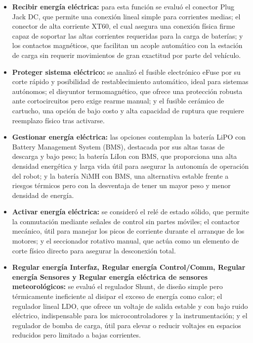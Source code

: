 \documentclass[../../General.tex]{subfiles}
\begin{document}
\begin{itemize}
	\item \textbf{Recibir energía eléctrica:} para esta función se evaluó el conector Plug Jack DC, que permite una conexión lineal simple para corrientes medias; el conector de alta corriente XT60, el cual asegura una conexión física firme capaz de soportar las altas corrientes requeridas para la carga de baterías; y los contactos magnéticos, que facilitan un acople automático con la estación de carga sin requerir movimientos de gran exactitud por parte del vehículo.
	
	\item \textbf{Proteger sistema eléctrico:} se analizó el fusible electrónico eFuse por su corte rápido y posibilidad de restablecimiento automático, ideal para sistemas autónomos; el disyuntor termomagnético, que ofrece una protección robusta ante cortocircuitos pero exige rearme manual; y el fusible cerámico de cartucho, una opción de bajo costo y alta capacidad de ruptura que requiere reemplazo físico tras activarse.
	
	\item \textbf{Gestionar energía eléctrica:} las opciones contemplan la batería LiPO con Battery Management System (BMS), destacada por sus altas tasas de descarga y bajo peso; la batería LiIon con BMS, que proporciona una alta densidad energética y larga vida útil para asegurar la autonomía de operación del robot; y la batería NiMH con BMS, una alternativa estable frente a riesgos térmicos pero con la desventaja de tener un mayor peso y menor densidad de energía.
	
	\item \textbf{Activar energía eléctrica:} se consideró el relé de estado sólido, que permite la conmutación mediante señales de control sin partes móviles; el contactor mecánico, útil para manejar los picos de corriente durante el arranque de los motores; y el seccionador rotativo manual, que actúa como un elemento de corte físico directo para asegurar la desconexión total.
	
	\item \textbf{Regular energía Interfaz, Regular energía Control/Comm, Regular energía Sensores y Regular energía eléctrica de sensores meteorológicos:} se evaluó el regulador Shunt, de diseño simple pero térmicamente ineficiente al disipar el exceso de energía como calor; el regulador lineal LDO, que ofrece un voltaje de salida estable y con bajo ruido eléctrico, indispensable para los microcontroladores y la instrumentación; y el regulador de bomba de carga, útil para elevar o reducir voltajes en espacios reducidos pero limitado a bajas corrientes.
	

\end{itemize}
\end{document}
